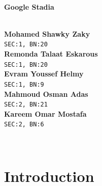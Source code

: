 \documentclass[a4paper,12pt]{article}
\begin{document}
\begin{titlepage}

\HRule \\[0.4cm]
{ \huge \bfseries Google Stadia}\\[0.4cm] %
\HRule \\[1cm]
 
\begin{minipage}{0.8\textwidth}
\begin{flushleft} 
\textbf{Mohamed Shawky Zaky} \\
\texttt{SEC:1, BN:20} \\[0.5cm]

\textbf{Remonda Talaat Eskarous} \\
\texttt{SEC:1, BN:20} \\[0.5cm]

\textbf{Evram Youssef Helmy} \\
\texttt{SEC:1, BN:9} \\[0.5cm]

\textbf{Mahmoud Osman Adas} \\
\texttt{SEC:2, BN:21} \\[0.5cm]

\textbf{Kareem Omar Mostafa} \\
\texttt{SEC:2, BN:6} \\[0.5cm]
\end{flushleft}
\end{minipage}\\[6cm]

\end{titlepage}

\thispagestyle{empty}

\tableofcontents
\listoffigures
\clearpage


\section{Introduction}

\newpage
\end{document}
